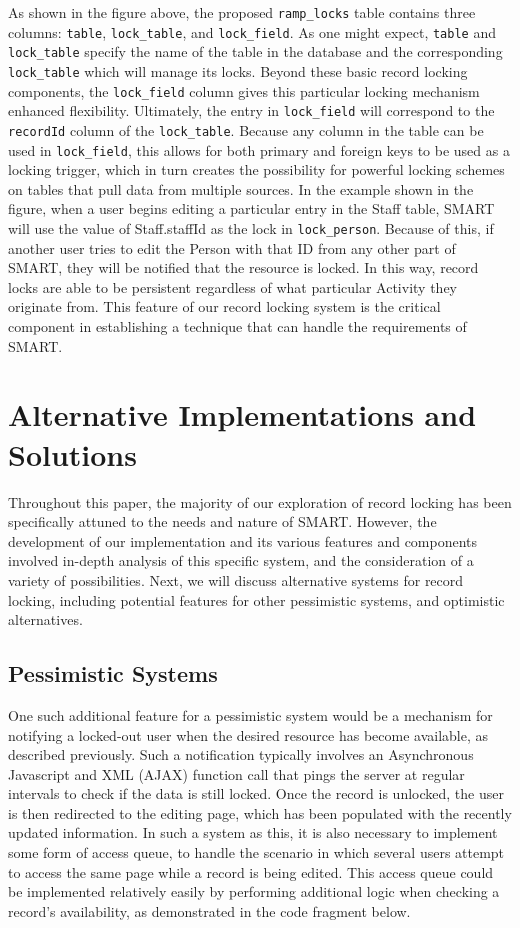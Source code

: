 \documentclass[12pt]{article}
\newcommand{\code}[1]{\texttt{#1}}
\begin{document}
As shown in the figure above, the proposed \code{ramp\_locks} table contains three columns: \code{table}, \code{lock\_table}, and \code{lock\_field}. As one might expect, \code{table} and \code{lock\_table} specify the name of the table in the database and the corresponding \code{lock\_table} which will manage its locks. Beyond these basic record locking components, the \code{lock\_field} column gives this particular locking mechanism enhanced flexibility. Ultimately, the entry in \code{lock\_field} will correspond to the \code{recordId} column of the \code{lock\_table}. Because any column in the table can be used in \code{lock\_field}, this allows for both primary and foreign keys to be used as a locking trigger, which in turn creates the possibility for powerful locking schemes on tables that pull data from multiple sources. In the example shown in the figure, when a user begins editing a particular entry in the Staff table, SMART will use the value of Staff.staffId as the lock in \code{lock\_person}. Because of this, if another user tries to edit the Person with that ID from any other part of SMART, they will be notified that the resource is locked. In this way, record locks are able to be persistent regardless of what particular Activity they originate from. This feature of our record locking system is the critical component in establishing a technique that can handle the requirements of SMART.

\section{Alternative Implementations and Solutions}

Throughout this paper, the majority of our exploration of record locking has been specifically attuned to the needs and nature of SMART. However, the development of our implementation and its various features and components involved in-depth analysis of this specific system, and the consideration of a variety of possibilities. Next, we will discuss alternative systems for record locking, including potential features for other pessimistic systems, and optimistic alternatives.

\subsection{Pessimistic Systems}
One such additional feature for a pessimistic system would be a mechanism for notifying a locked-out user when the desired resource has become available, as described previously. Such a notification typically involves an Asynchronous Javascript and XML (AJAX) function call that pings the server at regular intervals to check if the data is still locked. Once the record is unlocked, the user is then redirected to the editing page, which has been populated with the recently updated information. In such a system as this, it is also necessary to implement some form of access queue, to handle the scenario in which several users attempt to access the same page while a record is being edited. This access queue could be implemented relatively easily by performing additional logic when checking a record's availability, as demonstrated in the code fragment below.
\end{document}
